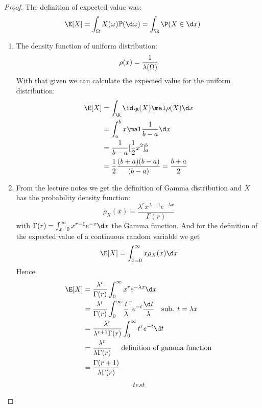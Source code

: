 \subsection{}
\begin{proof}
	The definition of expected value was:
	\[
	\E[X] = \int_{\O} X(\omega)\meas(\d \omega) = \int_{\R} \P(X \in \d x)
	\]
	\begin{enumerate}
		\item The density function of uniform distribution: 
		\[
			\rho(x) = \frac{1}{\lambda(\Omega)}
		\]
		With that given we can calculate the expected value for the uniform distribution:
		\begin{align*}
			\E[X] &= \int_{\R} \id_{\R} (X) \mal \rho(X) \d x\\
			&= \int_a^b x \mal \frac{1}{b-a} \d x\\
			&= \frac{1}{b-a} [\frac{1}{2} x^2]_a^b\\
			&= \frac{1}{2} \frac{(b+a)(b-a)}{(b-a)} = \frac{b+a}{2}
		\end{align*}
		\item From the lecture notes we get the definition of Gamma distribution and $X$ has the probability density function: %
		\[
			\rho_X (x) = \frac{\lambda^r x^{\lambda -1}e^{-\lambda x}}{\Gamma(r)}
		\] with $\Gamma(r) = \int_{x=0}^{\infty} x^{r-1}e^{-x}\d x$ the Gamma function. And for the definition of the expected value of a continuous random variable we get
		\[
			\E[X] = \int_{x=0}^{\infty}x \rho_X (x) \d x
		\]
		Hence
		\begin{align*}
			\E [X] &= \frac{\lambda^r}{\Gamma(r)} \int_0^{\infty} x^r e^{-\lambda x} \d x\\
			&= \frac{\lambda^r}{\Gamma(r)} \int_0^{\infty} \frac{t}{\lambda}^r e^{-t} \frac{\d t}{\lambda}\quad \text{sub. } t = \lambda x\\
			&= \frac{\lambda^r}{\lambda^{r+1}\Gamma(r)}\int_0^{\infty} t^r e^{-t} \d t\\
			&= \frac{\lambda^r}{\lambda \Gamma(r)} \quad \text{ definition of gamma function}\\
			&= \frac{\Gamma(r + 1)}{\lambda\Gamma(r)}
		\end{align*}
		\begin{align*}
			test
		\end{align*}
	\end{enumerate}
\end{proof}

